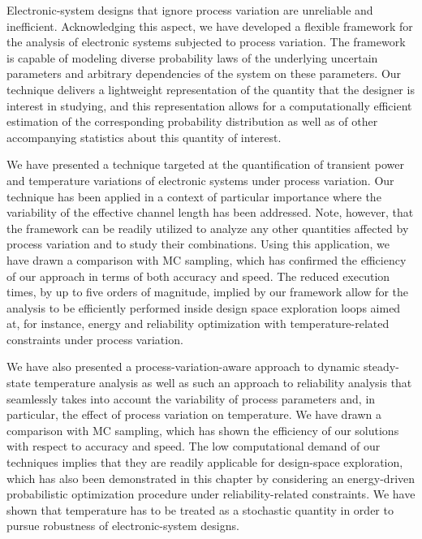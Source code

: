Electronic-system designs that ignore process variation are unreliable and
inefficient. Acknowledging this aspect, we have developed a flexible framework
for the analysis of electronic systems subjected to process variation. The
framework is capable of modeling diverse probability laws of the underlying
uncertain parameters and arbitrary dependencies of the system on these
parameters. Our technique delivers a lightweight representation of the quantity
that the designer is interest in studying, and this representation allows for a
computationally efficient estimation of the corresponding probability
distribution as well as of other accompanying statistics about this quantity of
interest.

We have presented a technique targeted at the quantification of transient power
and temperature variations of electronic systems under process variation. Our
technique has been applied in a context of particular importance where the
variability of the effective channel length has been addressed. Note, however,
that the framework can be readily utilized to analyze any other quantities
affected by process variation and to study their combinations. Using this
application, we have drawn a comparison with \ac{MC} sampling, which has
confirmed the efficiency of our approach in terms of both accuracy and speed.
The reduced execution times, by up to five orders of magnitude, implied by our
framework allow for the analysis to be efficiently performed inside design space
exploration loops aimed at, for instance, energy and reliability optimization
with temperature-related constraints under process variation.

We have also presented a process-variation-aware approach to dynamic
steady-state temperature analysis as well as such an approach to reliability
analysis that seamlessly takes into account the variability of process
parameters and, in particular, the effect of process variation on temperature.
We have drawn a comparison with \ac{MC} sampling, which has shown the efficiency
of our solutions with respect to accuracy and speed. The low computational
demand of our techniques implies that they are readily applicable for
design-space exploration, which has also been demonstrated in this chapter by
considering an energy-driven probabilistic optimization procedure under
reliability-related constraints. We have shown that temperature has to be
treated as a stochastic quantity in order to pursue robustness of
electronic-system designs.
